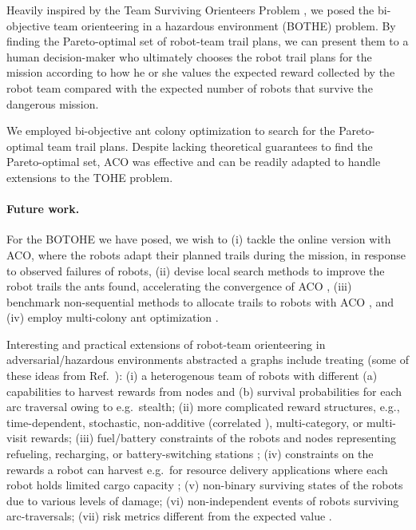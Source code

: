 \documentclass[fleqn,10pt,lineno]{wlpeerj}
\begin{document}
Heavily inspired by the Team Surviving Orienteers Problem \cite{jorgensen2018team,jorgensen2017matroid,jorgensen2024matroid}, we posed the bi-objective team orienteering in a hazardous environment (BOTHE) problem. 
By finding the Pareto-optimal set of robot-team trail plans, we can present them to a human decision-maker who ultimately chooses the robot trail plans for the mission according to how he or she values the expected reward collected by the robot team compared with the expected number of robots that survive the dangerous mission.

We employed bi-objective ant colony optimization to search for the Pareto-optimal team trail plans. Despite lacking theoretical guarantees to find the Pareto-optimal set, ACO was effective and can be readily adapted to handle extensions to the TOHE problem.

\paragraph{Future work.}
For the BOTOHE we have posed, we wish to (i) tackle the online version with ACO, where the robots adapt their planned trails during the mission, in response to observed failures of robots, (ii) devise local search methods to improve the robot trails the ants found, accelerating the convergence of ACO \cite{dorigo2006ant}, (iii) benchmark non-sequential methods to allocate trails to robots with ACO \cite{ke2008ants}, and (iv) employ multi-colony ant optimization \cite{iredi2001bi}.

Interesting and practical extensions of robot-team orienteering in adversarial/hazardous environments abstracted a graphs include treating (some of these ideas from Ref.~\cite{jorgensen2018team}): 
(i) a heterogenous team of robots with different (a) capabilities to harvest rewards from nodes and (b) survival probabilities for each arc traversal owing to e.g.\ stealth;
(ii) more complicated reward structures, e.g., time-dependent, stochastic, non-additive (correlated \cite{yu2014correlated}), multi-category, or multi-visit rewards;
(iii) fuel/battery constraints of the robots and nodes representing refueling, recharging, or battery-switching stations \cite{asghar2023risk,khuller2011fill,liao2016electric,yu2019coverage}; 
(iv) constraints on the rewards a robot can harvest e.g.\ for resource delivery applications where each robot holds limited cargo capacity \cite{coelho2014thirty};
(v) non-binary surviving states of the robots due to various levels of damage;
(vi) non-independent events of robots surviving arc-traversals;
(vii) risk metrics different from the expected value \cite{majumdar2020should}.
\end{document}

